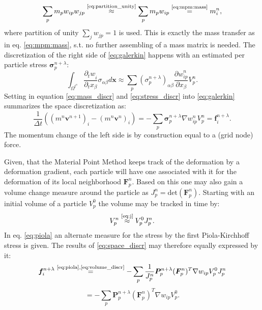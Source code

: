 \documentclass[m,times]{cgMA}
\begin{document}
\begin{equation}\label{eq:mass_discr}
\sum _ {  { p } }  { m } _ {  { p } }  { w } _ {ip}   w_{jp}
\stackrel{\text{\ref{eq:partition_unity}}}{\approx}
\sum_p m_p w_{ip}
\stackrel{\text{\ref{eq:mpm:mass}}}{=}
m_i^n,
\end{equation}
where partition of unity $\sum_j w_{jp} = 1$ is used. This is exactly the mass transfer as in eq. \ref{eq:mpm:mass}, s.t. no further assembling of a mass matrix is needed.
The discretization of the right side of \ref{eq:galerkin} happens with an estimated per particle stress $\boldsymbol{\sigma}_p^{n+\lambda}$:
\begin{equation}\label{eq:stress_discr}
\int _ { \Omega ^ {  t^ n } }   \frac{\partial{_t w } _ { {i  }}}{\partial_tx_\beta }  \sigma _ {{ \alpha } \beta }  { d } \boldsymbol { x } \approx
\sum _ { p } (\sigma _ { p }^{n+\lambda}) _ { \alpha \beta } \frac{{ \partial w } _ { {ip}}^n}{ \partial x_\beta }  V _ { p } ^ { n }.
\end{equation}
Setting in equation \ref{eq:mass_discr} and \ref{eq:stress_discr} into \ref{eq:galerkin} summarizes the space discretization as:
\begin{equation}\label{eq:space_discr}
  \frac{1}{\Delta t} (({m^n\boldsymbol{v}^{n+1}})_i-({m^n\boldsymbol{v}^n})_i) =
  -\sum _ { p } \boldsymbol{\sigma} _ { p }^{n+\lambda} \nabla w_{ip}^n V _ { p } ^ { n }
  = \boldsymbol{f}_i^{n+\lambda}.
\end{equation}
The momentum change of the left side is by construction equal to a (grid node) force.

Given, that the Material Point Method keeps track of the deformation by a deformation gradient, each particle will have one associated with it for the deformation of its local neighborhood $\boldsymbol{F}^n_p$. Based on this one may also gain a volume change measure around the particle as $J^n_p = \text{det}(\boldsymbol{F}^n_p)$. Starting with an initial volume of a particle $V_p^0$ the volume may be tracked in time by:
\begin{equation}\label{eq:volume_discr}
  V^n_p \stackrel{\text{\ref{eq:j}}}{\approx} V_p^0J^n_p.
\end{equation}
In eq. \ref{eq:piola} an alternate measure for the stress by the first Piola-Kirchhoff stress is given. The results of \ref{eq:space_discr} may therefore equally expressed by it:
$$
\boldsymbol{f}^{n+\lambda}_i \stackrel{\text{\ref{eq:piola},\ref{eq:volume_discr}}}{=}
- \sum_p \frac{1}{J^n_p}\boldsymbol{P}^{n+\lambda}_{p}(\boldsymbol{F}^{n}_{p})^T \nabla w_{ip}V^0_pJ^n_p
$$
\begin{equation}\label{eq:force_disc}
  = - \sum_p \boldsymbol{P}^{n+\lambda}_{p}(\boldsymbol{F}^{n}_{p})^T \nabla w_{ip}V^0_p.
\end{equation}
\begin{flushright}\cite{MPM:COURSE} \cite{MPM:APIC} \cite{bathe2006finite}\end{flushright}
\end{document}
